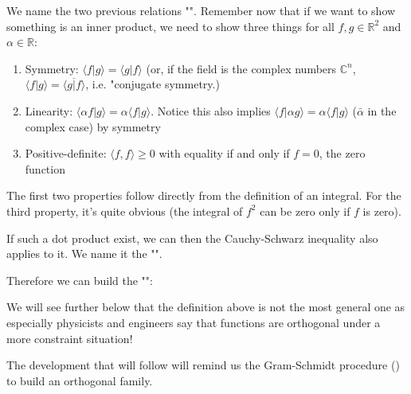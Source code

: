 	We name the two previous relations "".
	Remember now that if we want to show something is an inner product, we need to show three things for all $f,g\in \mathbb{R}^2$ and $\alpha\in \mathbb{R}$:
	\begin{enumerate}
		\item Symmetry: $\langle f|g\rangle=\langle g|f\rangle$ (or, if the field is the complex numbers $\mathbb{C}^n$, $\langle f|g\rangle=\overline{\langle g|f\rangle}$, i.e. "conjugate symmetry.)
	
		\item Linearity: $\langle \alpha f|g\rangle=\alpha \langle f|g\rangle$. Notice this also implies $\langle f|\alpha g\rangle=\alpha \langle f|g\rangle$ ($\bar{\alpha}$ in the complex case) by symmetry
	
		\item Positive-definite: $\langle f,f\rangle\geq 0$ with equality if and only if $f=0$, the zero function
	\end{enumerate}
	The first two properties follow directly from the definition of an integral. For the third property, it's quite obvious (the integral of $f^2$ can be zero only if $f$ is zero).
	\begin{tcolorbox}[title=Remark,colframe=black,arc=10pt]
	If such a dot product exist, we can then the Cauchy-Schwarz inequality also applies to it. We name it the "".
	\end{tcolorbox}
	
	Therefore we can build the "":
	
	\begin{tcolorbox}[title=Remark,colframe=black,arc=10pt]
	We will see further below that the definition above is not the most general one as especially physicists and engineers say that functions are orthogonal under a more constraint situation!
	\end{tcolorbox}
	The development that will follow will remind us the Gram-Schmidt procedure () to build an orthogonal family.
	
